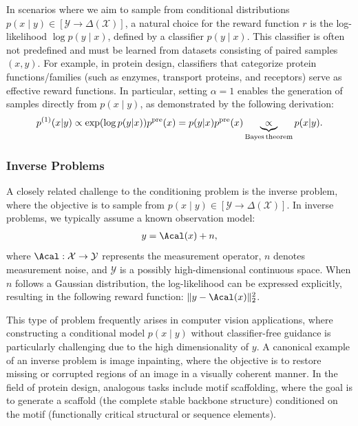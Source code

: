 \documentclass[12pt]{article} %
\begin{document}
{In scenarios where we aim to sample from conditional distributions $p(x \mid y) \in [\mathcal{Y} \to \Delta(\mathcal{X})]$, a natural choice for the reward function $r$ is the log-likelihood $\log p(y \mid x)$, defined by a classifier $p(y \mid x)$. This classifier is often not predefined and must be learned from datasets consisting of paired samples $(x, y)$. For example, in protein design, classifiers that categorize protein functions/families (such as enzymes, transport proteins, and receptors) serve as effective reward functions. In particular, setting $\alpha = 1$ enables the generation of samples directly from $p(x \mid y)$, as demonstrated by the following derivation:
\begin{align*}
    p^{(1)}(x|y) \propto \exp(\log p(y|x))p^{\mathrm{pre}}(x)=p(y|x)p^{\mathrm{pre}}(x) \underbrace{\propto}_{\mathrm{Bayes\,theorem}} p(x|y). 
\end{align*}


\subsubsection{Inverse Problems}

A closely related challenge to the conditioning problem is the inverse problem, where the objective is to sample from $p(x \mid y) \in [\mathcal{Y} \to \Delta(\mathcal{X})]$. In inverse problems, we typically assume a known observation model:
\begin{align*} 
y = \Acal(x) + n, 
\end{align*}
where $\Acal: \mathcal{X} \to \mathcal{Y}$ represents the measurement operator, $n$ denotes measurement noise, and $\mathcal{Y}$ is a possibly high-dimensional continuous space. When $n$ follows a Gaussian distribution, the log-likelihood can be expressed explicitly, resulting in the following reward function: $\|y - \Acal(x)\|_2^2$. 

This type of problem frequently arises in computer vision applications, where constructing a conditional model $p(x \mid y)$ without classifier-free guidance is particularly challenging due to the high dimensionality of $y$. A canonical example of an inverse problem is image inpainting, where the objective is to restore missing or corrupted regions of an image in a visually coherent manner. In the field of protein design, analogous tasks include motif scaffolding, where the goal is to generate a scaffold (the complete stable backbone structure) conditioned on the motif (functionally critical structural or sequence elements).

}
\end{document}
